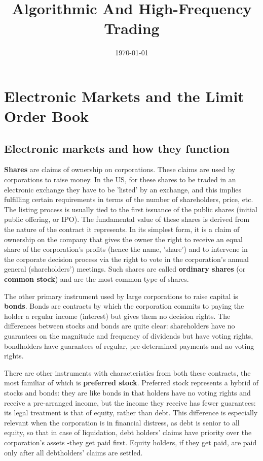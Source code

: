 \documentclass[11pt]{article}
\date{\today}
\title{Algorithmic And High-Frequency Trading}
\begin{document}
\maketitle
\tableofcontents

\section{Electronic Markets and the Limit Order Book}
\label{sec:org4a8bff0}
\subsection{Electronic markets and how they function}
\label{sec:org0663d95}
\textbf{Shares} are claims of ownership on corporations. These claims are used by corporations to raise money.
In the US, for these shares to be traded in an electronic exchange they have to be 'listed' by an
exchange, and this implies fulfilling certain requirements in terms of the number of shareholders,
price, etc. The listing process is usually tied to the first issuance of the public shares (initial
public offering, or IPO). The fundamental value of these shares is derived from the nature of the
contract it represents. In its simplest form, it is a claim of ownership on the company that gives the
owner the right to receive an equal share of the corporation's profits (hence the name, 'share') and
to intervene in the corporate decision process via the right to vote in the corporation's annual
general (shareholders') meetings. Such shares are called \textbf{ordinary shares} (or \textbf{common stock}) and are the
most common type of shares.

The other primary instrument used by large corporations to raise capital is \textbf{bonds}. Bonds are contracts
by which the corporation commits to paying the holder a regular income (interest) but gives them no
decision rights. The differences between stocks and bonds are quite clear: shareholders have no
guarantees on the magnitude and frequency of dividends but have voting rights, bondholders have
guarantees of regular, pre-determined payments and no voting rights.

There are other instruments with characteristics from both these contracts, the most familiar of which
is \textbf{preferred stock}. Preferred stock represents a hybrid of stocks and bonds: they are like bonds in
that holders have no voting rights and receive a pre-arranged income, but the income they receive has
fewer guarantees: its legal treatment is that of equity, rather than debt. This difference is
especially relevant when the corporation is in financial distress, as debt is senior to all equity, so
that in case of liquidation, debt holders' claims have priority over the corporation's assets -they
get paid first. Equity holders, if they get paid, are paid only after all debtholders' claims are
settled.
\end{document}
